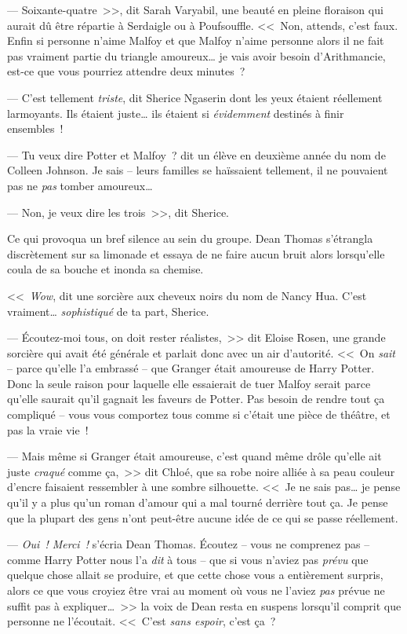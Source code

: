 --- Soixante-quatre~>>, dit Sarah Varyabil, une beauté en pleine floraison qui aurait dû être répartie à Serdaigle ou à Poufsouffle. <<~Non, attends, c'est faux. Enfin si personne n'aime Malfoy et que Malfoy n'aime personne alors il ne fait pas vraiment partie du triangle amoureux… je vais avoir besoin d'Arithmancie, est-ce que vous pourriez attendre deux minutes~?

--- C'est tellement \emph{triste}, dit Sherice Ngaserin dont les yeux étaient réellement larmoyants. Ils étaient juste… ils étaient si \emph{évidemment} destinés à finir ensembles~!

--- Tu veux dire Potter et Malfoy~? dit un élève en deuxième année du nom de Colleen Johnson. Je sais -- leurs familles se haïssaient tellement, il ne pouvaient pas ne \emph{pas} tomber amoureux…

--- Non, je veux dire les trois~>>, dit Sherice.

Ce qui provoqua un bref silence au sein du groupe. Dean Thomas s'étrangla discrètement sur sa limonade et essaya de ne faire aucun bruit alors lorsqu'elle coula de sa bouche et inonda sa chemise.

<<~\emph{Wow}, dit une sorcière aux cheveux noirs du nom de Nancy Hua. C'est vraiment… \emph{sophistiqué} de ta part, Sherice.

--- Écoutez-moi tous, on doit rester réalistes,~>> dit Eloise Rosen, une grande sorcière qui avait été générale et parlait donc avec un air d'autorité. <<~On \emph{sait} -- parce qu'elle l'a embrassé -- que Granger était amoureuse de Harry Potter. Donc la seule raison pour laquelle elle essaierait de tuer Malfoy serait parce qu'elle saurait qu'il gagnait les faveurs de Potter. Pas besoin de rendre tout ça compliqué -- vous vous comportez tous comme si c'était une pièce de théâtre, et pas la vraie vie~!

--- Mais même si Granger était amoureuse, c'est quand même drôle qu'elle ait juste \emph{craqué} comme ça,~>> dit Chloé, que sa robe noire alliée à sa peau couleur d'encre faisaient ressembler à une sombre silhouette. <<~Je ne sais pas… je pense qu'il y a plus qu'un roman d'amour qui a mal tourné derrière tout ça. Je pense que la plupart des gens n'ont peut-être aucune idée de ce qui se passe réellement.

--- \emph{Oui~! Merci~!} s'écria Dean Thomas. Écoutez -- vous ne comprenez pas -- comme Harry Potter nous l'a \emph{dit} à tous -- que si vous n'aviez pas \emph{prévu} que quelque chose allait se produire, et que cette chose vous a entièrement surpris, alors ce que vous croyiez être vrai au moment où vous ne l'aviez \emph{pas} prévue ne suffit pas à expliquer…~>> la voix de Dean resta en suspens lorsqu'il comprit que personne ne l'écoutait. <<~C'est \emph{sans espoir}, c'est ça~?

